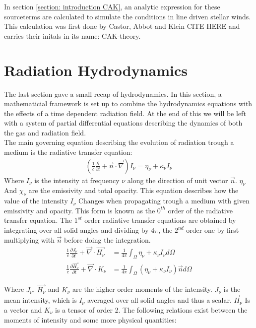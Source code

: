 In section \ref{section: introduction CAK}, an analytic expression for these sourceterms are calculated to simulate the conditions in line driven stellar winds. This calculation was first done by Castor, Abbot and Klein CITE HERE and carries their initals in its name: CAK-theory.

\section{Radiation Hydrodynamics}
The last section gave a small recap of hydrodynamics. In this section, a mathematicial framework is set up to combine the hydrodynamics equations with the effects of a time dependent radiation field. At the end of this we will be left with a system of partial differential equations describing the dynamics of both the gas and radiation field.\\ 
The main governing equation describing the evolution of radiation trough a medium is the radiative transfer equation:
\begin{align}
\left( \frac{1}{c} \frac{\partial}{\partial t} + \vec{n} \cdot \vec{\nabla} \right) I_\nu = \eta_\nu + \kappa_\nu I_\nu
\end{align}
Where $I_\nu$ is the intensity at frequency $\nu$ along the direction of unit vector $\vec{n}$. $\eta_\nu$ And $\chi_\nu$ are the emissivity and total opacity. This equation describes how the value of the intensity $I_\nu$ Changes when propagating trough a medium with given emissivity and opacity. This form is known as the $0^{th}$ order of the radiative transfer equation. The $1^{st}$  order radiative transfer equations are obtained by integrating over all solid angles and dividing by $4 \pi$, the $2^{nd}$ order one by first multiplying with $\vec{n}$ before doing the integration.\\

\begin{align}
\frac{1}{c} \frac{\partial J_\nu}{\partial t} + \vec{\nabla} \cdot \vec{H_\nu} &= \frac{1}{4 \pi} \int_\Omega \eta_\nu + \kappa_\nu I_\nu d\Omega \\
\frac{1}{c} \frac{\partial \vec{H_\nu}}{\partial t} + \vec{\nabla} \cdot K_\nu &= \frac{1}{4 \pi} \int_\Omega \left( \eta_\nu + \kappa_\nu I_\nu\right) \vec{n} d\Omega
\end{align}

Where $J_\nu$, $\vec{H_\nu}$ and $K_\nu$ are the higher order moments of the intensity. $J_\nu$ is the mean intensity, which is $I_\nu$ averaged over all solid angles and thus a scalar. $\vec{H}_\nu$ Is a vector and $K_\nu$ is a tensor of order 2. The following relations exist between the moments of intensity and some more physical quantities:

